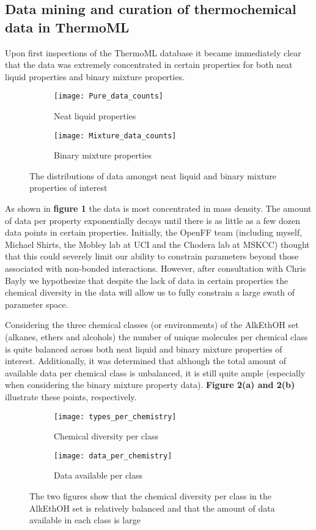 \documentclass[rmp,nofootinbib,superscriptaddress,12pt,tightenlines,notitlepage]{revtex4-1}
\begin{document}
\subsection{Data mining and curation of thermochemical data in ThermoML}
Upon first inspections of the ThermoML database it became immediately clear that the data was extremely concentrated in certain properties for both 
neat liquid properties and binary mixture properties. 
\begin{figure}[h!]
\centering
\begin{subfigure}{.5\textwidth}
  \centering
  \texttt{[image: Pure\_data\_counts]}
  \caption{Neat liquid properties}
  \label{fig:sub1}
\end{subfigure}%
\begin{subfigure}{.5\textwidth}
  \centering
  \texttt{[image: Mixture\_data\_counts]}
  \caption{Binary mixture properties}
  \label{fig:sub2}
\end{subfigure}
\caption{The distributions of data amongst neat liquid and binary mixture properties of interest}
\label{fig:test}
\end{figure}
As shown in \textbf{figure 1} the data is most concentrated in mass density. The amount of data per property exponentially decays
until there is as little as a few dozen data points in certain properties. Initially, the OpenFF team (including myself, Michael Shirts, the 
Mobley lab at UCI and the Chodera lab at MSKCC) thought that this could severely limit our ability to constrain parameters beyond those 
associated with non-bonded interactions. However, after consultation with Chris Bayly we hypothesize that despite the lack of data in certain properties
the chemical diversity in the data will allow us to fully constrain a large swath of parameter space.

Considering the three chemical classes (or environments) of the AlkEthOH set (alkanes, ethers and alcohols) the number of unique molecules per chemical class is quite balanced 
across both neat liquid and binary mixture properties of interest. Additionally, it was determined that although the total amount of available data per chemical class is unbalanced, it is still quite ample (especially when considering the binary mixture property data). \textbf{Figure 2(a) and 2(b)} illustrate these
points, respectively.
\begin{figure}[h!]
\centering
\begin{subfigure}{.5\textwidth}
  \centering
  \texttt{[image: types\_per\_chemistry]}
  \caption{Chemical diversity per class}
  \label{fig:sub1}
\end{subfigure}%
\begin{subfigure}{.5\textwidth}
  \centering
  \texttt{[image: data\_per\_chemistry]}
  \caption{Data available per class}
  \label{fig:sub2}
\end{subfigure}
\caption{The two figures show that the chemical diversity per class in the AlkEthOH set is relatively balanced and that the amount of data available in each class is large}
\label{fig:test}
\end{figure}
\end{document}
